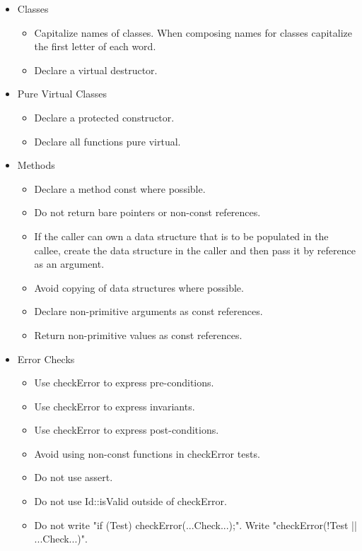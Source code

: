 \documentclass[10pt, letterpaper, twoside]{article}
\begin{document}
{\begin{itemize}
\item[] Classes
 \begin{itemize}
  \item	Capitalize names of classes.  When composing names for classes capitalize the first letter of each word.
  \item	Declare a virtual destructor.
 \end{itemize}

\item[] Pure Virtual Classes
 \begin{itemize}
  \item	Declare a protected constructor.
  \item	Declare all functions pure virtual.
 \end{itemize}

\item[] Methods
 \begin{itemize}
  \item	Declare a method const where possible.
  \item	Do not return bare pointers or non-const references.
  \item	If the caller can own a data structure that is to be populated in the callee, create the data structure in the caller and then pass it by reference as an argument.
  \item	Avoid copying of data structures where possible.
  \item	Declare non-primitive arguments as const references.
  \item	Return non-primitive values as const references.
 \end{itemize}

\item[] Error Checks
 \begin{itemize}
  \item	Use checkError to express pre-conditions.
  \item	Use checkError to express invariants.
  \item	Use checkError to express post-conditions.
  \item	Avoid using non-const functions in checkError tests.
  \item	Do not use assert.
  \item	Do not use Id::isValid outside of checkError.
  \item	Do not write "if (Test) checkError(...Check...);".  Write "checkError(!Test || ...Check...)".
 \end{itemize}


\end{itemize}}
\end{document}
